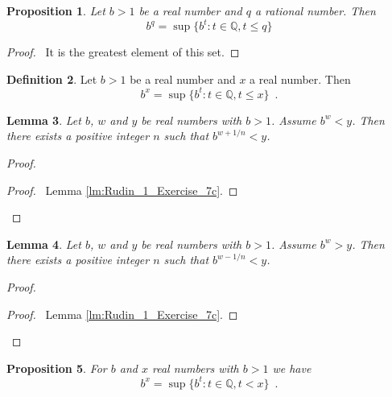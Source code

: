 \documentclass{book}
\let\qed\relax
\newtheorem{prop}{Proposition}[chapter]
\newtheorem{lm}[prop]{Lemma}
\theoremstyle{definition}
\newtheorem{df}[prop]{Definition}
\begin{document}
\begin{prop}
Let $b > 1$ be a real number and $q$ a rational number. Then
\[ b^q = \sup \{ b^t : t \in \mathbb{Q}, t \leq q \} \]
\end{prop}

\begin{proof}
\pf\ It is the greatest element of this set. \qed
\end{proof}

\begin{df}
Let $b > 1$ be a real number and $x$ a real number. Then
\[ b^x = \sup \{ b^t : t \in \mathbb{Q}, t \leq x \} \enspace . \]
\end{df}

\begin{lm}
Let $b$, $w$ and $y$ be real numbers with $b > 1$. Assume $b^w < y$. Then there exists a positive integer $n$ such that $b^{w + 1/n} < y$.
\end{lm}

\begin{proof}
\pf
{}
\begin{proof}
	\pf\ Lemma \ref{lm:Rudin_1_Exercise_7c}.
\end{proof}
\qed
\end{proof}

\begin{lm}
\label{lm:Rudin_1_Exercise_7e}
Let $b$, $w$ and $y$ be real numbers with $b > 1$. Assume $b^w > y$. Then there exists a positive integer $n$ such that $b^{w - 1/n} < y$.
\end{lm}

\begin{proof}
\pf
{}
\begin{proof}
	\pf\ Lemma \ref{lm:Rudin_1_Exercise_7c}.
\end{proof}
\qed
\end{proof}

\begin{prop}
For $b$ and $x$ real numbers with $b > 1$ we have
\[ b^x = \sup \{ b^t : t \in \mathbb{Q}, t < x \} \enspace . \]
\end{prop}
\end{document}
